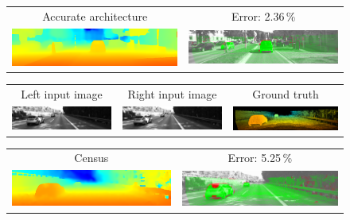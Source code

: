 \documentclass[twoside,11pt]{article}
\begin{document}
\begin{figure}[p]
\begin{center}
\begin{tabular}{cc}
Accurate architecture &
Error: 2.36\,\% \\
\includegraphics[scale=0.5]{img/kitti2015_slow_122_pred_.png} &
\includegraphics[scale=0.5]{img/kitti2015_slow_122_err_.png}\\
\end{tabular}

\begin{tabular}{ccc}%
\midrule
\rule{0pt}{4ex}Left input image &
Right input image &
Ground truth \\
\includegraphics[scale=0.5]{img/kitti2015_000195_10L_.png} &
\includegraphics[scale=0.5]{img/kitti2015_000195_10R_.png} &
\includegraphics[scale=0.5]{img/kitti2015_195_gt_.png}\\
\end{tabular}

\begin{tabular}{cc}
Census &
Error: 5.25\,\% \\
\includegraphics[scale=0.5]{img/kitti2015_census_195_pred_.png} &
\includegraphics[scale=0.5]{img/kitti2015_census_195_err_.png}\\


\end{tabular}
\end{center}
\end{figure}
\end{document}
